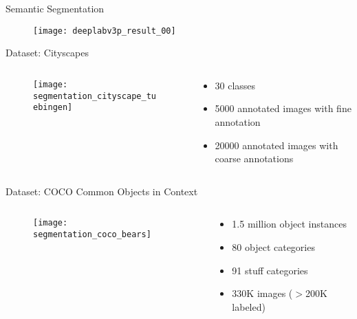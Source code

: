 \begin{frame}{Semantic Segmentation}
  \begin{figure}
    \texttt{[image: deeplabv3p\_result\_00]}
  \end{figure}
\end{frame}


\begin{frame}{Dataset: Cityscapes}
  \begin{columns}
    \begin{column}{0.48\textwidth}
      \begin{figure}
        \texttt{[image: segmentation\_cityscape\_tuebingen]}
      \end{figure}
    \end{column}
    \begin{column}{0.48\textwidth}
    \begin{itemize}
      \item 30 classes
      \item 5000 annotated images with fine annotation
      \item 20000 annotated images with coarse annotations
    \end{itemize}

    \end{column}
  \end{columns}

\end{frame}


\begin{frame}{Dataset: COCO Common Objects in Context }
  \begin{columns}
    \begin{column}{0.48\textwidth}
      \begin{figure}
        \texttt{[image: segmentation\_coco\_bears]}
      \end{figure}
    \end{column}
    \begin{column}{0.48\textwidth}
    \begin{itemize}
      \item 1.5 million object instances
      \item 80 object categories
      \item 91 stuff categories
      \item 330K images ($>$200K labeled)
    \end{itemize}

    \end{column}
  \end{columns}

\end{frame}



